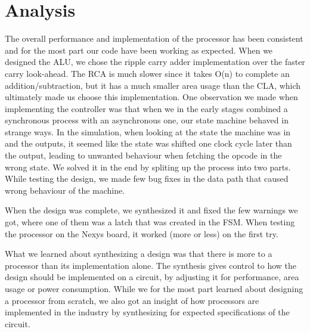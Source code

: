 \documentclass[a4,11pt]{article}
\begin{document}
\section{Analysis}

The overall performance and implementation of the processor has been consistent
and for the most part our code have been working as expected. When we designed
the ALU, we chose the ripple carry adder implementation over the faster carry
look-ahead. The RCA is much slower since it takes O(n) to complete an
addition/subtraction, but it has a much smaller area usage than the CLA, which
ultimately made us choose this implementation. One observation we made when 
implementing the controller was that when we in the early stages combined a
synchronous process with an asynchronous one, our state machine behaved in
strange ways. In the simulation, when looking at the state the machine was in
and the outputs, it seemed like the state was shifted one clock cycle later
than the output, leading to unwanted behaviour when fetching the opcode in
the wrong state. We solved it in the end by spliting up the process into two
parts. While testing the design, we made few bug fixes in the data path that
caused wrong behaviour of the machine.

When the design was complete, we synthesized it and fixed the few warnings we
got, where one of them was a latch that was created in the FSM. When testing
the processor on the Nexys board, it worked (more or less) on the first try.

What we learned about synthesizing a design was that there is more to a
processor than its implementation alone. The synthesis gives control to how
the design should be implemented on a circuit, by adjusting it for performance,
area usage or power consumption. While we for the most part learned about
designing a processor from scratch, we also got an insight of how processors
are implemented in the industry by synthesizing for expected specifications of
the circuit.
\end{document}
